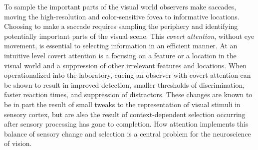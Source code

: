 To sample the important parts of the visual world observers make saccades, moving the high-resolution and color-sensitive fovea to informative locations. Choosing to make a saccade requires sampling the periphery and identifying potentially important parts of the visual scene. This \emph{covert attention}, without eye movement, is essential to selecting information in an efficient manner. At an intuitive level covert attention is a focusing on a feature or a location in the visual world and a suppression of other irrelevant features and locations. When operationalized into the laboratory, cueing an observer with covert attention can be shown to result in improved detection, smaller thresholds of discrimination, faster reaction times, and suppression of distractors. These changes are known to be in part the result of small tweaks to the representation of visual stimuli in sensory cortex, but are also the result of context-dependent selection occurring after sensory processing has gone to completion. How attention implements this balance of sensory change and selection is a central problem for the neuroscience of vision.